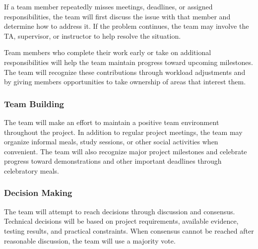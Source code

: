 \documentclass{article}
\begin{document}
If a team member repeatedly misses meetings, deadlines, or assigned responsibilities, the team will first discuss the issue with that member and determine how to address it. If the problem continues, the team may involve the TA, supervisor, or instructor to help resolve the situation.

Team members who complete their work early or take on additional responsibilities will help the team maintain progress toward upcoming milestones. The team will recognize these contributions through workload adjustments and by giving members opportunities to take ownership of areas that interest them.

\subsubsection*{Team Building}


The team will make an effort to maintain a positive team environment throughout the project. In addition to regular project meetings, the team may organize informal meals, study sessions, or other social activities when convenient. The team will also recognize major project milestones and celebrate progress toward demonstrations and other important deadlines through celebratory meals.

\subsubsection*{Decision Making} 


The team will attempt to reach decisions through discussion and consensus. Technical decisions will be based on project requirements, available evidence, testing results, and practical constraints. When consensus cannot be reached after reasonable discussion, the team will use a majority vote.
\end{document}

